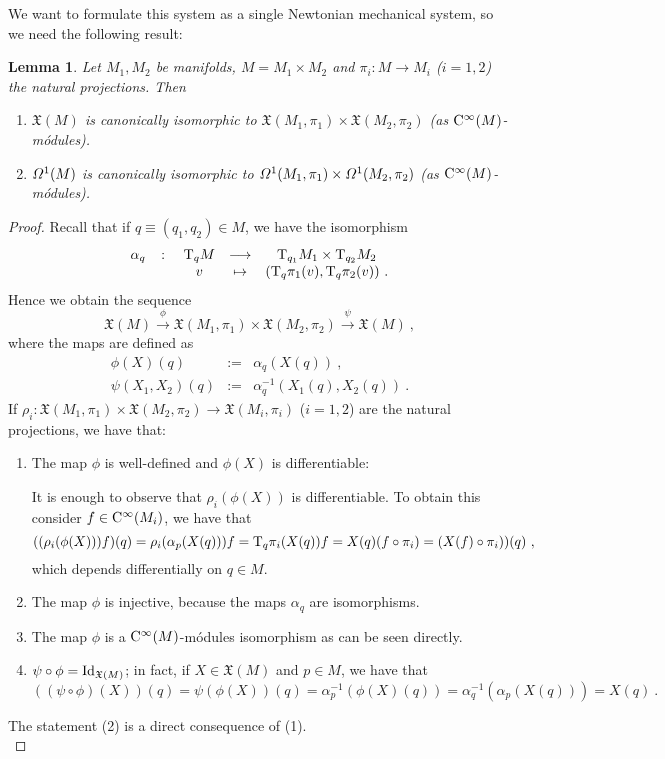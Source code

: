 \documentclass[12pt]{report}
\newtheorem{lem}[teor]{Lemma}
\def\beann{\begin{eqnarray*}}
\def\eeann{\end{eqnarray*}}
\def\ben{\begin{enumerate}}
\def\een{\end{enumerate}}
\def\mapping#1{\mathrel{\mathop{\longrightarrow}\limits^{#1}}}
\def\qed{\ifvmode\removelastskip\fi
{\unskip\nobreak\hfil\penalty50\hbox{}\nobreak\hfil
\hbox{\vrule height1.2ex width1.2ex}\parfillskip=0pt
\finalhyphendemerits=0 \par\smallskip}}
\def\vf{\mathfrak X}
\def\df{{\mit\Omega}}
\def\Tan{{\rm T}}
\def\Cinfty{{\rm C}^\infty}
\begin{document}
We want to formulate this system as a single Newtonian mechanical system, so we need the following result:

\begin{lem}
Let $M_1,M_2$ be manifolds, $M=M_1\times M_2$ and  $\pi_i\colon M\to  M_i$ ($i=1,2$) the natural projections. Then
\ben
\item
$\vf (M)$ is canonically isomorphic to
$\vf (M_1,\pi_1)\times\vf (M_2,\pi_2)$ (as $\Cinfty(M)$-m\'odules).
\item
$\df^1(M)$ is canonically isomorphic to
$\df^1(M_1,\pi_1)\times\df^1(M_2,\pi_2)$ (as $\Cinfty(M)$-m\'odules).
\een
\end{lem}
\begin{proof}
Recall that if $q\equiv (q_1,q_2)\in M$, we have the isomorphism
$$
\begin{array}{ccccc}
\alpha_q & \colon & \Tan_qM & \longrightarrow & \Tan_{q_1}M_1\times\Tan_{q_2}M_2  \\
& & v &\mapsto & (\Tan_q\pi_1(v),\Tan_q\pi_2(v)) \ .
\end{array}
$$
Hence we obtain the sequence
$$
\vf (M) \mapping{\phi} \vf (M_1,\pi_1)\times\vf (M_2,\pi_2) \mapping{\psi}\vf (M) \ ,
$$
where the maps are defined as
\beann
\phi (X)(q)&:=&\alpha_q (X(q)) \ , \\
\psi (X_1,X_2)(q)&:=&\alpha_q^{-1}(X_1(q),X_2(q)) \ .
\eeann
If $\rho_i\colon\vf (M_1,\pi_1)\times\vf (M_2,\pi_2)\to\vf (M_i,\pi_i)$ ($i=1,2$)
are the natural projections, we have that:
\ben
\item
The map $\phi$ is well-defined and $\phi (X)$ is differentiable:

It is enough to observe that $\rho_i(\phi(X))$ is differentiable.
To obtain this consider $f\in\Cinfty (M_i)$, we have that
$$
((\rho_i(\phi(X)))f)(q)=\rho_i(\alpha_p(X(q)))f=\Tan_q\pi_i(X(q))f=
X(q)(f\circ\pi_i)=(X(f)\circ\pi_i))(q) \ ,
$$
which depends differentially on $q\in M$.
\item
The map $\phi$ is injective, because the maps $\alpha_q$ are isomorphisms.
\item
The map $\phi$ is a $\Cinfty(M)$-m\'odules isomorphism as can be seen directly.
\item
$\psi\circ\phi={\rm Id}_{\vf (M)}$;
in fact, if $X\in\vf(M)$ and $p\in M$, we have that
$$
((\psi\circ\phi)(X))(q)=\psi(\phi (X))(q)=\alpha_p^{-1}(\phi(X)(q))=
\alpha_q^{-1}(\alpha_p(X(q)))=X(q) \ .
$$
\een

The statement (2) is a direct consequence of (1).
\\ \qed \end{proof}
\end{document}
